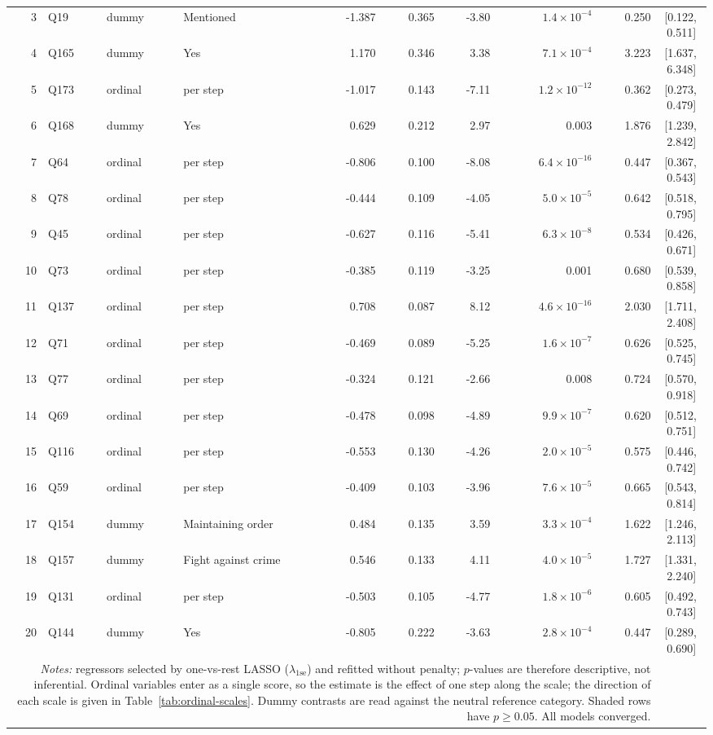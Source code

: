 \begin{landscape}
\begin{longtable}{r l l l r r r r r c}
3 & Q19 & dummy & Mentioned & -1.387 & 0.365 & -3.80 & $1.4{\times}10^{-4}$ & 0.250 & [0.122,\,0.511] &  \\
4 & Q165 & dummy & Yes & 1.170 & 0.346 & 3.38 & $7.1{\times}10^{-4}$ & 3.223 & [1.637,\,6.348] &  \\
5 & Q173 & ordinal & per step & -1.017 & 0.143 & -7.11 & $1.2{\times}10^{-12}$ & 0.362 & [0.273,\,0.479] &  \\
6 & Q168 & dummy & Yes & 0.629 & 0.212 & 2.97 & 0.003 & 1.876 & [1.239,\,2.842] &  \\
7 & Q64 & ordinal & per step & -0.806 & 0.100 & -8.08 & $6.4{\times}10^{-16}$ & 0.447 & [0.367,\,0.543] &  \\
8 & Q78 & ordinal & per step & -0.444 & 0.109 & -4.05 & $5.0{\times}10^{-5}$ & 0.642 & [0.518,\,0.795] &  \\
9 & Q45 & ordinal & per step & -0.627 & 0.116 & -5.41 & $6.3{\times}10^{-8}$ & 0.534 & [0.426,\,0.671] &  \\
10 & Q73 & ordinal & per step & -0.385 & 0.119 & -3.25 & 0.001 & 0.680 & [0.539,\,0.858] &  \\
11 & Q137 & ordinal & per step & 0.708 & 0.087 & 8.12 & $4.6{\times}10^{-16}$ & 2.030 & [1.711,\,2.408] &  \\
12 & Q71 & ordinal & per step & -0.469 & 0.089 & -5.25 & $1.6{\times}10^{-7}$ & 0.626 & [0.525,\,0.745] &  \\
13 & Q77 & ordinal & per step & -0.324 & 0.121 & -2.66 & 0.008 & 0.724 & [0.570,\,0.918] &  \\
14 & Q69 & ordinal & per step & -0.478 & 0.098 & -4.89 & $9.9{\times}10^{-7}$ & 0.620 & [0.512,\,0.751] &  \\
15 & Q116 & ordinal & per step & -0.553 & 0.130 & -4.26 & $2.0{\times}10^{-5}$ & 0.575 & [0.446,\,0.742] &  \\
16 & Q59 & ordinal & per step & -0.409 & 0.103 & -3.96 & $7.6{\times}10^{-5}$ & 0.665 & [0.543,\,0.814] &  \\
17 & Q154 & dummy & Maintaining order & 0.484 & 0.135 & 3.59 & $3.3{\times}10^{-4}$ & 1.622 & [1.246,\,2.113] &  \\
18 & Q157 & dummy & Fight against crime & 0.546 & 0.133 & 4.11 & $4.0{\times}10^{-5}$ & 1.727 & [1.331,\,2.240] &  \\
19 & Q131 & ordinal & per step & -0.503 & 0.105 & -4.77 & $1.8{\times}10^{-6}$ & 0.605 & [0.492,\,0.743] &  \\
20 & Q144 & dummy & Yes & -0.805 & 0.222 & -3.63 & $2.8{\times}10^{-4}$ & 0.447 & [0.289,\,0.690] &  \\
\multicolumn{9}{p{0.95\linewidth}}{\footnotesize \emph{Notes:} regressors selected by one-vs-rest LASSO ($\lambda_{1\text{se}}$) and refitted without penalty; $p$-values are therefore descriptive, not inferential. Ordinal variables enter as a single score, so the estimate is the effect of one step along the scale; the direction of each scale is given in Table~\ref{tab:ordinal-scales}. Dummy contrasts are read against the neutral reference category. Shaded rows have $p \geq 0.05$. All models converged.}\\
\end{longtable}
\endgroup
\end{landscape}
